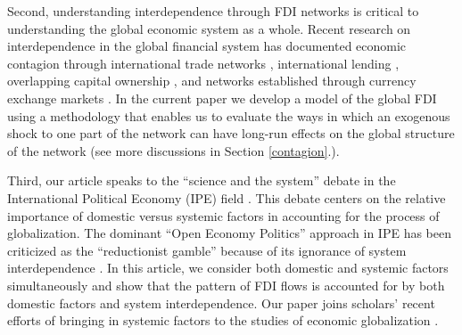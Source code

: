 \documentclass[reqno,onecolumn,letterpaper,12pt]{article}
\begin{document}

Second, understanding interdependence through FDI networks is critical to understanding the global economic system as a whole.  Recent research on interdependence in the global financial system has documented economic contagion through international trade networks \citep{kali2010financial},  international lending \citep{zakaria2017evidence,Oatley_et_al:2013}, overlapping capital ownership \citep{chuluun2017global}, and networks established through currency exchange markets \citep{matesanz2014network}. In the current paper we develop a model of the global FDI using a methodology that enables us to evaluate the ways in which an exogenous shock to one part of the network can have long-run effects on the global structure of the network (see more discussions in Section \ref{contagion}.). %

Third, our article speaks to the ``science and the system'' debate in the International Political Economy (IPE) field \citep[see,][]{Chaudoin_Milner:2017,Oatley:2011,Chaudoin_et_al:2014,Cohen:2008,Drezner_McNamara:2013}. This debate centers on the relative importance of domestic versus systemic factors in accounting for the process of globalization. The dominant ``Open Economy Politics'' approach \citep{Lake:2009} in IPE has been criticized as the ``reductionist gamble'' because of its ignorance of system interdependence \citep{Oatley:2011}. In this article, we consider both domestic and systemic factors simultaneously and show that the pattern of FDI flows is accounted for by both domestic factors and system interdependence. Our paper joins scholars' recent efforts of bringing in systemic factors to the studies of economic globalization \cite[see,~e.g.,][]{Chaudoin_et_al:2014,ward2013gravity,cao2014democracies,Chaudoin_Wilf:2018,Hafner-Burton:2009}.
\end{document}
